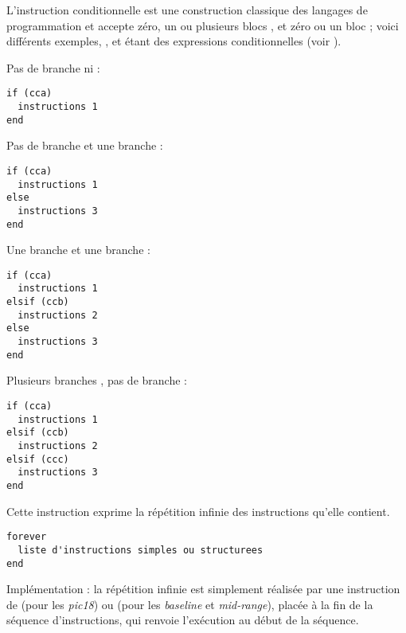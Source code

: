 L'instruction conditionnelle est une construction classique des langages de programmation et accepte zéro, un ou plusieurs blocs , et zéro ou un bloc  ; voici différents exemples, ,  et  étant des expressions conditionnelles (voir ).


Pas de branche  ni  :
\begin{lstlisting}[language=piccolo]
if (cca)
  instructions 1
end
\end{lstlisting}

Pas de branche  et une branche  :
\begin{lstlisting}[language=piccolo]
if (cca)
  instructions 1
else
  instructions 3
end
\end{lstlisting}

Une branche  et une branche  :
\begin{lstlisting}[language=piccolo]
if (cca)
  instructions 1
elsif (ccb)
  instructions 2
else
  instructions 3
end
\end{lstlisting}

Plusieurs branches , pas de branche  :
\begin{lstlisting}[language=piccolo]
if (cca)
  instructions 1
elsif (ccb)
  instructions 2
elsif (ccc)
  instructions 3
end
\end{lstlisting}






Cette instruction exprime la répétition infinie des instructions qu'elle contient.
\begin{lstlisting}[language=piccolo]
forever
  liste d'instructions simples ou structurees
end
\end{lstlisting}

Implémentation : la répétition infinie est simplement réalisée par une instruction de  (pour les \emph{pic18}) ou  (pour les \emph{baseline} et \emph{mid-range}), placée à la fin de la séquence d'instructions, qui renvoie l'exécution au début de la séquence.










